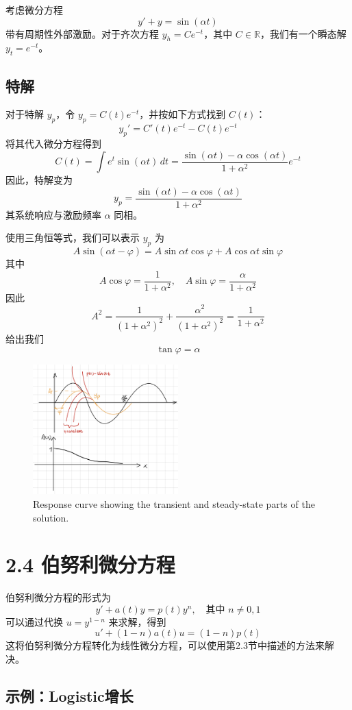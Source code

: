 \documentclass{ctexart}
\begin{document}
考虑微分方程
\[ y' + y = \sin(\alpha t) \]
带有周期性外部激励。对于齐次方程 \( y_h = C e^{-t} \)，其中 \( C \in \mathbb{R} \)，我们有一个瞬态解 \( y_t = e^{-t} \)。

\subsection*{特解}
对于特解 \( y_p \)，令 \( y_p = C(t)e^{-t} \)，并按如下方式找到 \( C(t) \)：
\[ y_p' = C'(t)e^{-t} - C(t)e^{-t} \]
将其代入微分方程得到
\[ C(t) = \int e^{t} \sin(\alpha t) \, dt = \frac{\sin(\alpha t) - \alpha \cos(\alpha t)}{1 + \alpha^2} e^{-t} \]
因此，特解变为
\[ y_p = \frac{\sin(\alpha t) - \alpha \cos(\alpha t)}{1 + \alpha^2} \]
其系统响应与激励频率 \( \alpha \) 同相。

使用三角恒等式，我们可以表示 \( y_p \) 为
\[ A \sin(\alpha t - \varphi) = A \sin \alpha t \cos \varphi + A \cos \alpha t \sin \varphi \]
其中
\[ A \cos \varphi = \frac{1}{1 + \alpha^2}, \quad A \sin \varphi = \frac{\alpha}{1 + \alpha^2} \]
因此
\[ A^2 = \frac{1}{(1 + \alpha^2)^2} + \frac{\alpha^2}{(1 + \alpha^2)^2} = \frac{1}{1 + \alpha^2} \]
给出我们
\[ \tan \varphi = \alpha \]


\begin{figure}[h!]
\centering
\includegraphics[width=0.5\textwidth]{response_curve.png}
\caption{Response curve showing the transient and steady-state parts of the solution.}
\end{figure}

\section*{2.4 伯努利微分方程}
伯努利微分方程的形式为
\[ y' + a(t)y = p(t)y^n, \quad \text{其中 } n \neq 0,1 \]
可以通过代换 \( u = y^{1-n} \) 来求解，得到
\[ u' + (1-n)a(t)u = (1-n)p(t) \]
这将伯努利微分方程转化为线性微分方程，可以使用第2.3节中描述的方法来解决。

\subsection*{示例：Logistic增长}
\end{document}
